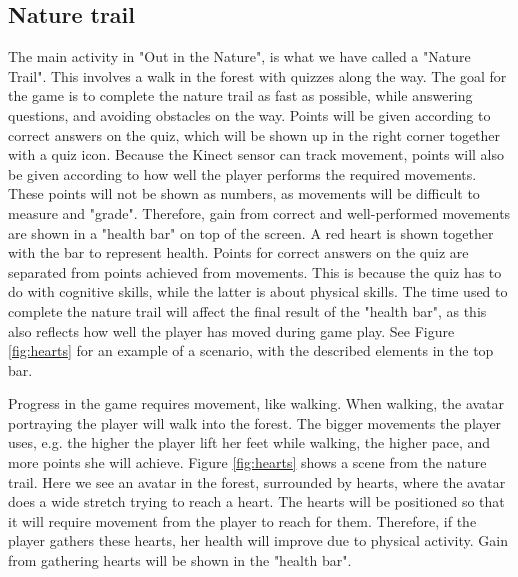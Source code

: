 \subsection{Nature trail}
The main activity in "Out in the Nature", is what we have called a "Nature Trail". This involves a walk in the forest with quizzes along the way. The goal for the game is to complete the nature trail as fast as possible, while answering questions, and avoiding obstacles on the way. Points will be given according to correct answers on the quiz, which will be shown up in the right corner together with a quiz icon. Because the Kinect sensor can track movement, points will also be given according to how well the player performs the required movements. These points will not be shown as numbers, as movements will be difficult to measure and "grade". Therefore, gain from correct and well-performed movements are shown in a "health bar" on top of the screen. A red heart is shown together with the bar to represent health. Points for correct answers on the quiz are separated from points achieved from movements. This is because the quiz has to do with cognitive skills, while the latter is about physical skills. The time used to complete the nature trail will affect the final result of the "health bar", as this also reflects how well the player has moved during game play.  See Figure \ref{fig:hearts} for an example of a scenario, with the described elements in the top bar.

Progress in the game requires movement, like walking. When walking, the avatar portraying the player will walk into the forest. The bigger movements the player uses, e.g. the higher the player lift her feet while walking, the higher pace, and more points she will achieve. Figure \ref{fig:hearts} shows a scene from the nature trail. Here we see an avatar in the forest, surrounded by hearts, where the avatar does a wide stretch trying to reach a heart. The hearts will be positioned so that it will require movement from the player to reach for them. Therefore, if the player gathers these hearts, her health will improve due to physical activity. Gain from gathering hearts will be shown in the "health bar".   

